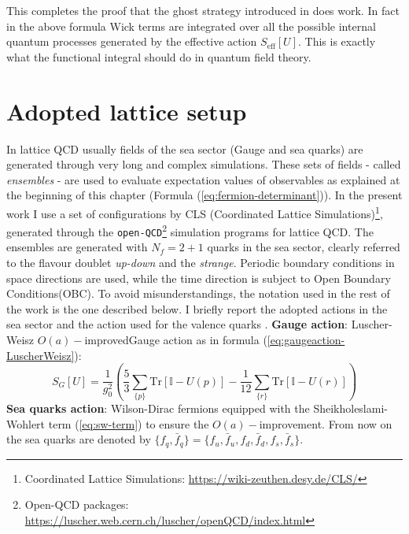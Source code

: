 \documentclass[english, LaM, oneside, noexaminfo]{sapthesis}
\newcommand{\oaid}{$O(a)-$improved}
\newcommand{\oait}{$O(a)-$improvement}
\newcommand{\obc}{Open Boundary Conditions}
\newcommand{\tr}{\text{Tr}}
\begin{document}
This completes the proof that the ghost strategy introduced in \cite{Morel} does work.
In fact in the above formula Wick terms are integrated over all the possible internal quantum processes generated by the effective action $S_\text{eff}[U]$.
This is exactly what the functional integral should do in quantum field theory.

\section{Adopted lattice setup}\label{sec:setup}
\noindent
In lattice QCD usually fields of the sea sector (Gauge and sea quarks) are generated through very long and complex simulations.
These sets of fields - called {\it ensembles} - are used to evaluate expectation values of observables as explained at the beginning of this chapter (Formula (\ref{eq:fermion-determinant})).
In the present work I use a set of configurations by CLS \cite{Bruno} (Coordinated Lattice Simulations)\footnote{Coordinated Lattice Simulations:  \href{https://wiki-zeuthen.desy.de/CLS/}{https://wiki-zeuthen.desy.de/CLS/}}, generated through the \texttt{open-QCD}\footnote{Open-QCD packages: \href{https://luscher.web.cern.ch/luscher/openQCD/index.html}{https://luscher.web.cern.ch/luscher/openQCD/index.html}} simulation programs for lattice QCD.
The ensembles are generated with $N_f = 2+1$ quarks in the sea sector, clearly referred to the flavour doublet {\it up-down} and the {\it strange}.
Periodic boundary conditions in space directions are used, while the time direction is subject to \obc\space (OBC).
To avoid misunderstandings, the notation used in the rest of the work is the one described below.
I briefly report the adopted actions in the sea sector and the action used for the valence quarks \cite{tmMixAct}.
\newline\newline
{\bf Gauge action}: Luscher-Weisz \oaid\space Gauge action as in formula (\ref{eq:gaugeaction-LuscherWeisz}):
\begin{equation*}
    S_G[U] = \frac{1}{g_0^2} \left( \frac{5}{3} \sum_{\{p\}} \tr \left[ \mathbb{I} - U(p)\right] - \frac{1}{12} \sum_{\{r\}} \tr \left[ \mathbb{I} - U(r)\right] \right) 
\end{equation*}
\newline
{\bf Sea quarks action}: Wilson-Dirac fermions equipped with the Sheikholeslami-Wohlert term (\ref{eq:sw-term}) to ensure the \oait.
From now on the sea quarks are denoted by $\{f_q, \bar f_q\} = \{f_u, \bar f_u, f_d, \bar f_d, f_s, \bar f_s\}$.
\end{document}
